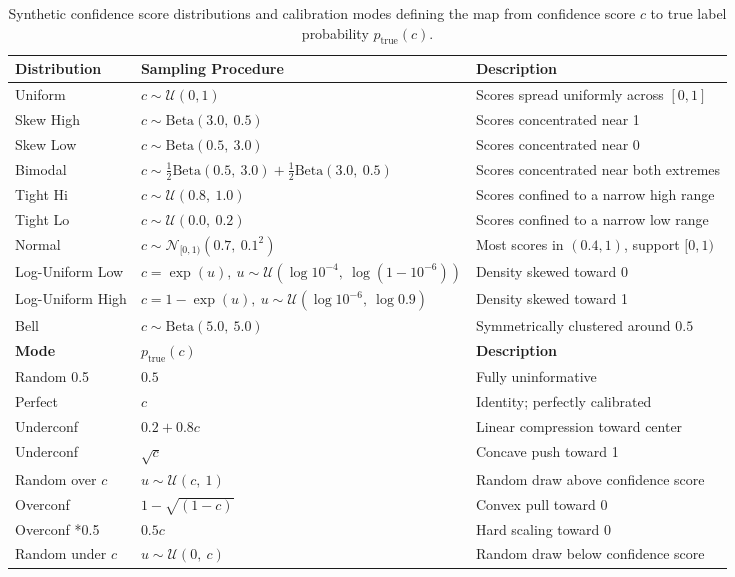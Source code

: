 \documentclass{article}
\theoremstyle{plain}
\theoremstyle{definition}
\theoremstyle{remark}
\begin{document}
\begin{table}[h]
\centering
\footnotesize
\begin{tabular}{lll}
\toprule
\textbf{Distribution} & \textbf{Sampling Procedure} & \textbf{Description} \\
\midrule
Uniform & $c \sim \mathcal{U}(0, 1)$ & Scores spread uniformly across $[0,1]$ \\
Skew High & $c \sim \text{Beta}(3.0,\ 0.5)$ & Scores concentrated near 1 \\
Skew Low & $c \sim \text{Beta}(0.5,\ 3.0)$ & Scores concentrated near 0 \\
Bimodal & $c \sim \tfrac{1}{2}\text{Beta}(0.5,\ 3.0) + \tfrac{1}{2}\text{Beta}(3.0,\ 0.5)$ & Scores concentrated near both extremes \\
Tight Hi & $c \sim \mathcal{U}(0.8,\ 1.0)$ & Scores confined to a narrow high range \\
Tight Lo & $c \sim \mathcal{U}(0.0,\ 0.2)$ & Scores confined to a narrow low range \\
Normal & $c \sim \mathcal{N}_{[0,1)}(0.7,\ 0.1^2)$ & Most scores in $(0.4,1)$, support $[0,1)$ \\
Log-Uniform Low & $c = \exp(u),\ u \sim \mathcal{U}(\log 10^{-4},\ \log(1 - 10^{-6}))$ & Density skewed toward 0 \\
Log-Uniform High & $c = 1 - \exp(u),\ u \sim \mathcal{U}(\log 10^{-6},\ \log 0.9)$ & Density skewed toward 1 \\
Bell & $c \sim \text{Beta}(5.0,\ 5.0)$ & Symmetrically clustered around $0.5$ \\
\midrule
\textbf{Mode} & $p_{\text{true}}(c)$ & \textbf{Description} \\
\midrule
Random 0.5        & $0.5$                        & Fully uninformative \\
Perfect           & $c$                          & Identity; perfectly calibrated \\
Underconf & $0.2 + 0.8c$            & Linear compression toward center \\
Underconf  & $\sqrt{c}$               & Concave push toward 1 \\
Random over $c$  & $u \sim \mathcal{U}(c,\ 1)$ & Random draw above confidence score \\
Overconf  & $1-\sqrt{(1-c)}$ & Convex pull toward 0 \\
Overconf *0.5 & $0.5c$               & Hard scaling toward 0 \\
Random under $c$  & $u \sim \mathcal{U}(0,\ c)$ & Random draw below confidence score \\
\bottomrule
\end{tabular}
\caption{Synthetic confidence score distributions and calibration modes defining the map from confidence score $c$ to true label probability $p_{\text{true}}(c)$. }
\label{tab:distributions}
\end{table}
\end{document}
